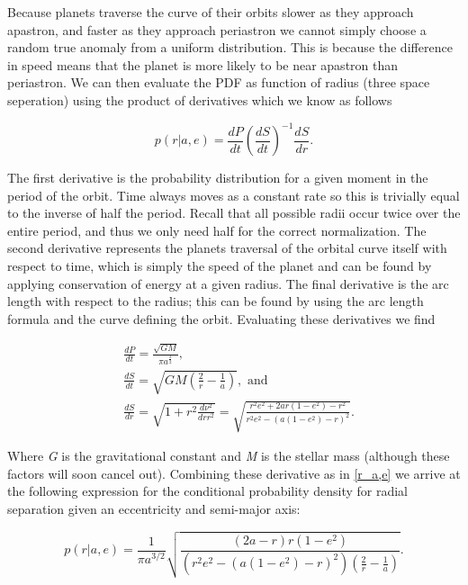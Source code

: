 \documentclass{article}
\begin{document}
	Because planets traverse the curve of their orbits slower as they approach apastron, and faster as they approach periastron we cannot simply choose a random true anomaly from a uniform distribution. This is because the difference in speed means that the planet is more likely to be near apastron than periastron. We can then evaluate the PDF as function of radius (three space seperation) using the product of derivatives which we know as follows
	
	\begin{equation}\label{r_a,e}
	p(r|a,e) = \frac{dP}{dt} \left( \frac{dS}{dt} \right)^{-1}\frac{dS}{dr}.
	\end{equation}  
	
	The first derivative is the probability distribution for a given moment in the period of the orbit. Time always moves as a constant rate so this is trivially equal to the inverse of half the period. Recall that all possible radii occur twice over the entire period, and thus we only need half for the correct normalization. The second derivative represents the planets traversal of the orbital curve itself with respect to time, which is simply the speed of the planet and can be found by applying conservation of energy at a given radius. The final derivative is the arc length with respect to the radius; this can be found by using the arc length formula and the curve defining the orbit. Evaluating these derivatives we find
	
	\begin{align}
	&\frac{dP}{dt} = \frac{\sqrt{GM}}{ \pi a^{\frac{3}{2}}}, \\
	&\frac{dS}{dt} = \sqrt{GM \left( \frac{2}{r} - \frac{1}{a} \right)}, \mbox{ and} \\
	&\frac{dS}{dr} = \sqrt{1 + r^2 \frac{d\nu^2}{drr^2}} = \sqrt{\frac{r^2e^2 +2ar(1-e^2) - r^2}{r^2e^2 - (a(1-e^2) - r)^2}}.
	\end{align}

	Where \textit{G} is the gravitational constant and \textit{M} is the stellar mass (although these factors will soon cancel out). Combining these derivative as in \eqref{r_a,e} we arrive at the following expression for the conditional probability density for radial separation given an eccentricity and semi-major axis:
	
	\begin{equation} \label{r_a,e_long}
	p(r|a,e) = \frac{1}{\pi a^{3/2}}\sqrt{\frac{(2a - r)r(1 - e^2)}{(r^2e^2 - (a(1-e^2) - r)^2)\left( \frac{2}{r} - \frac{1}{a} \right)}}.
	\end{equation}
	
\end{document}
